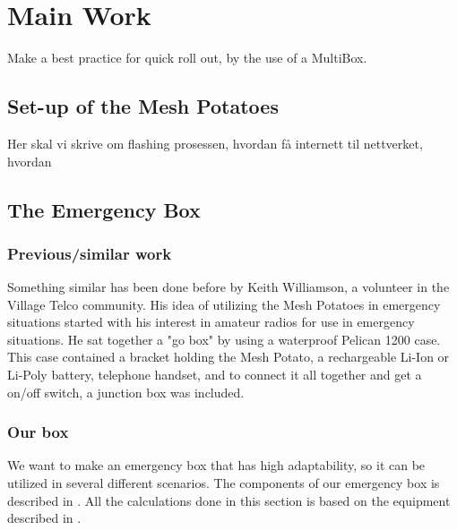     \chapter{Main Work}
\label{chp:quickrollout} 

Make a best practice for quick roll out, by the use of a MultiBox. 

\section{Set-up of the Mesh Potatoes}
Her skal vi skrive om flashing prosessen, hvordan få internett til nettverket, hvordan 

\section{The Emergency Box}

\subsection{Previous/similar work}
Something similar has been done before by Keith Williamson, a volunteer in the Village Telco community. His idea of utilizing the Mesh Potatoes in emergency situations started with his interest in amateur radios for use in emergency situations. He sat together a "go box" by using a waterproof Pelican 1200 case.  This case contained a bracket holding the Mesh Potato, a rechargeable Li-Ion or Li-Poly battery, telephone handset, and to connect it all together and get a on/off switch, a junction box was included. 

\subsection{Our box}
We want to make an emergency box that has high adaptability, so it can be utilized in several different scenarios. The components of our emergency box is described in . All the calculations done in this section is based on the equipment described in .

